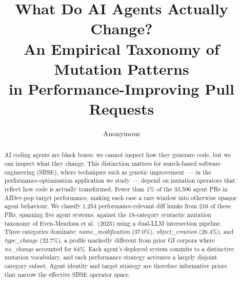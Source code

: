 \documentclass[runningheads]{llncs}
\begin{document}
\title{What Do AI Agents Actually Change? \\
       An Empirical Taxonomy of Mutation Patterns \\
       in Performance-Improving Pull Requests}

\author{Anonymous}

\maketitle

\begin{abstract}

AI coding agents are black boxes: we cannot inspect how they generate code,
but we can inspect what they change. This distinction matters for
search-based software engineering (SBSE), where techniques such as genetic
improvement~--- in the performance-optimisation application we study~---
depend on mutation operators that reflect how code is actually transformed.
Fewer than 1\% of the 33{,}596 agent PRs in AIDev-pop target performance,
making each case a rare window into otherwise opaque agent behaviour. We
classify 1{,}254 performance-relevant diff hunks from 216 of these PRs,
spanning five agent systems, against the 18-category syntactic mutation
taxonomy of Even-Mendoza et al.\ (2025) using a dual-LLM intersection
pipeline. Three categories dominate: \emph{name\_modification} (37.0\%),
\emph{object\_creation} (26.4\%), and \emph{type\_change} (22.7\%), a
profile markedly different from prior GI corpora where \emph{no\_change}
accounted for 84\%. Each agent's deployed system commits to a distinctive mutation vocabulary,
and each performance strategy activates a largely disjoint category subset.
Agent identity and target strategy are therefore informative priors that
narrow the effective SBSE operator space.


\end{abstract}
\end{document}
